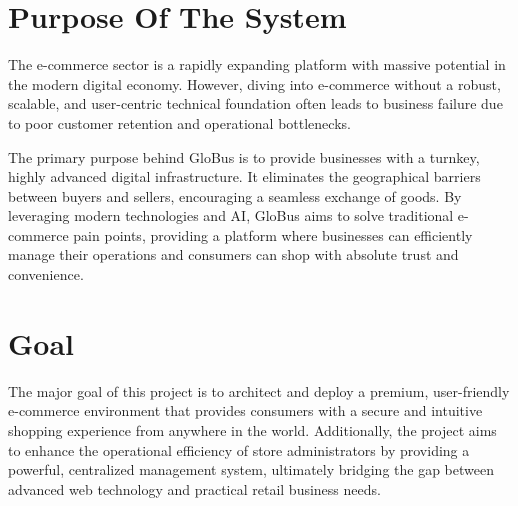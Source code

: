\section{Purpose Of The System}
The e-commerce sector is a rapidly expanding platform with massive potential in the modern digital economy. However, diving into e-commerce without a robust, scalable, and user-centric technical foundation often leads to business failure due to poor customer retention and operational bottlenecks. 

The primary purpose behind GloBus is to provide businesses with a turnkey, highly advanced digital infrastructure. It eliminates the geographical barriers between buyers and sellers, encouraging a seamless exchange of goods. By leveraging modern technologies and AI, GloBus aims to solve traditional e-commerce pain points, providing a platform where businesses can efficiently manage their operations and consumers can shop with absolute trust and convenience.

\section{Goal}
The major goal of this project is to architect and deploy a premium, user-friendly e-commerce environment that provides consumers with a secure and intuitive shopping experience from anywhere in the world. Additionally, the project aims to enhance the operational efficiency of store administrators by providing a powerful, centralized management system, ultimately bridging the gap between advanced web technology and practical retail business needs.
